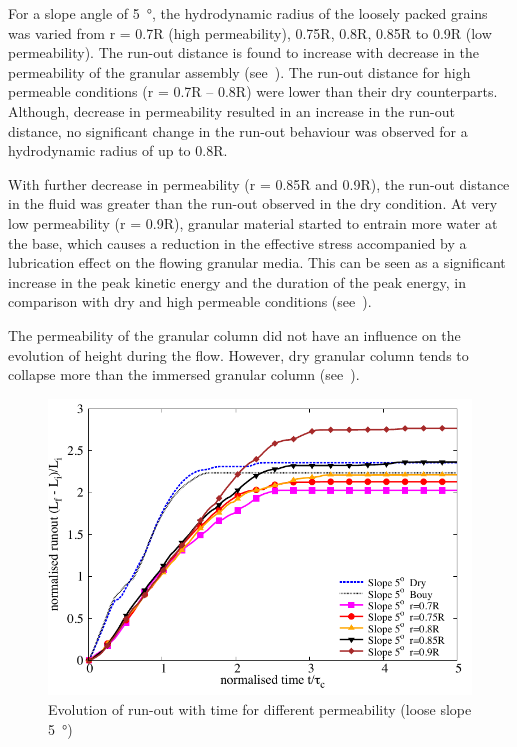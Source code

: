 For a slope angle of \SI{5}{\degree}, the hydrodynamic radius of the loosely packed grains was varied from r = 0.7R (high permeability), 0.75R, 0.8R, 0.85R to 0.9R (low permeability). The run-out distance is found to increase with decrease in the permeability of the granular assembly (see~). The run-out distance for high permeable conditions (r = 0.7R -- 0.8R) were lower than their dry counterparts. Although, decrease in permeability resulted in an increase in the run-out distance, no significant change in the run-out behaviour was observed for a hydrodynamic radius of up to 0.8R.

With further decrease in permeability (r = 0.85R and 0.9R), the run-out distance in the fluid was greater than the run-out observed in the dry condition. At very low permeability (r = 0.9R), granular material started to entrain more water at the base, which causes a reduction in the effective stress accompanied by a lubrication effect on the flowing granular media. This can be seen as a significant increase in the peak kinetic energy and the duration of the peak energy, in comparison with dry and high permeable conditions (see~).

The permeability of the granular column did not have an influence on the evolution of height during the flow. However, dry granular column tends to collapse more than the immersed granular column (see~).

\begin{figure}
\centering
\includegraphics[width=0.97\columnwidth]{Runout_loose_5}
\caption{Evolution of run-out with time for different permeability (loose slope \SI{5}{\degree})}
\label{fig:run5}
\end{figure}


